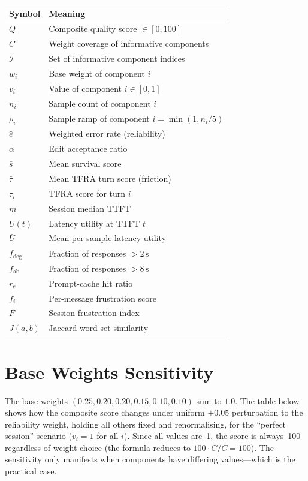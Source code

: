 \documentclass[11pt,a4paper]{article}
\newcommand{\calI}{\mathcal{I}}
\begin{document}
\begin{table}[h!]
\centering
\begin{tabular}{@{}ll@{}}
\toprule
Symbol & Meaning \\
\midrule
$Q$ & Composite quality score $\in [0, 100]$ \\
$C$ & Weight coverage of informative components \\
$\calI$ & Set of informative component indices \\
$w_i$ & Base weight of component $i$ \\
$v_i$ & Value of component $i \in [0,1]$ \\
$n_i$ & Sample count of component $i$ \\
$\rho_i$ & Sample ramp of component $i = \min(1, n_i/5)$ \\
$\hat{e}$ & Weighted error rate (reliability) \\
$\alpha$ & Edit acceptance ratio \\
$\bar{s}$ & Mean survival score \\
$\bar{\tau}$ & Mean TFRA turn score (friction) \\
$\tau_i$ & TFRA score for turn $i$ \\
$m$ & Session median TTFT \\
$U(t)$ & Latency utility at TTFT $t$ \\
$\bar{U}$ & Mean per-sample latency utility \\
$f_{\text{deg}}$ & Fraction of responses $> 2\,\text{s}$ \\
$f_{\text{ab}}$ & Fraction of responses $> 8\,\text{s}$ \\
$r_c$ & Prompt-cache hit ratio \\
$f_i$ & Per-message frustration score \\
$F$ & Session frustration index \\
$J(a,b)$ & Jaccard word-set similarity \\
\bottomrule
\end{tabular}
\end{table}

\section{Base Weights Sensitivity}
\label{app:sensitivity}

The base weights $(0.25, 0.20, 0.20, 0.15, 0.10, 0.10)$ sum to $1.0$.
The table below shows how the composite score changes under uniform
$\pm 0.05$ perturbation to the reliability weight, holding all others fixed
and renormalising, for the ``perfect session'' scenario ($v_i = 1$ for all $i$).
Since all values are~1, the score is always~100 regardless of weight choice
(the formula reduces to $100 \cdot C / C = 100$).  The sensitivity only
manifests when components have differing values---which is the practical case.
\end{document}
